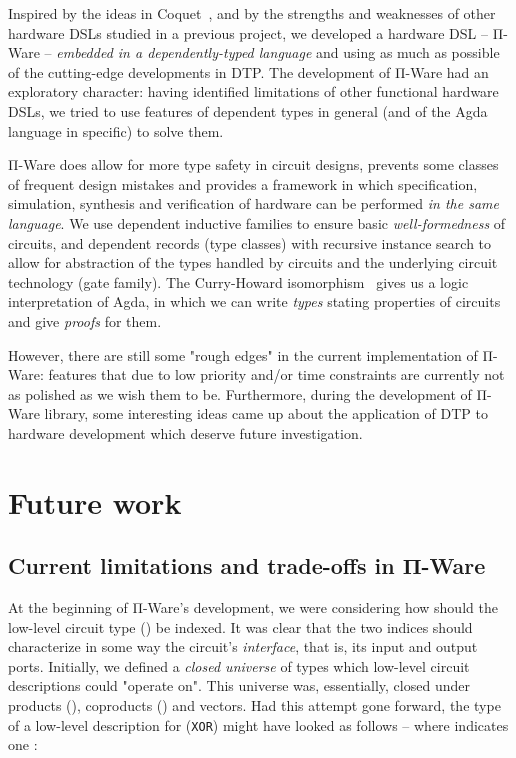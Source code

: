     Inspired by the ideas in Coquet~\cite{coquet2011}, and by the strengths and weaknesses of other
    hardware \acp{DSL} studied in a previous project, we developed
    a hardware \ac{DSL} – Π-Ware – \emph{embedded in a dependently-typed language} and using
    as much as possible of the cutting-edge developments in \ac{DTP}.
    The development of Π-Ware had an exploratory character: having identified limitations of
    other functional hardware \acp{DSL}, we tried to use features of dependent types in general
    (and of the Agda language in specific) to solve them.

    Π-Ware does allow for more type safety in circuit designs,
    prevents some classes of frequent design mistakes and provides a framework
    in which specification, simulation, synthesis and verification
    of hardware can be performed \emph{in the same language}.
    We use dependent inductive families to ensure basic \emph{well-formedness} of circuits,
    and dependent records (type classes) with recursive instance search to allow for abstraction
    of the types handled by circuits and the underlying circuit technology (gate family).
    The Curry-Howard isomorphism~\cite{propositions-as-types} gives us a logic interpretation of Agda,
    in which we can write \emph{types} stating properties of circuits and give \emph{proofs} for them.

    However, there are still some "rough edges" in the current implementation of Π-Ware:
    features that due to low priority and/or time constraints are currently not as polished as we wish them to be.
    Furthermore, during the development of Π-Ware library,
    some interesting ideas came up about the application of \ac{DTP} to hardware development
    which deserve future investigation.


    \section{Future work}
    \label{sec:future-work}

        \subsection{Current limitations and trade-offs in Π-Ware}
        \label{subsec:current-limitations}

            At the beginning of Π-Ware's development, we were considering
            how should the low-level circuit type () be indexed.
            It was clear that the two indices should characterize in some way the circuit's \emph{interface},
            that is, its input and output ports.
            Initially, we defined a \emph{closed universe} of types which low-level circuit descriptions
            could "operate on". This universe was, essentially, closed under products (),
            coproducts () and vectors.
            Had this attempt gone forward, the type of a low-level description for  (\texttt{XOR})
            might have looked as follows – where  indicates one :

